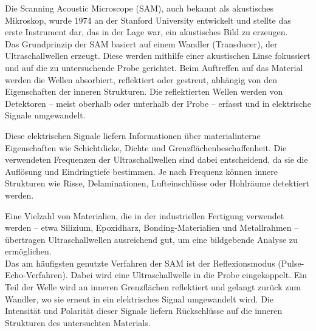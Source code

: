 Die Scanning Acoustic Microscope (SAM), auch bekannt als akustisches Mikroskop, wurde 1974 an der Stanford University entwickelt und stellte das erste Instrument dar, das in der Lage war, ein akustisches Bild zu erzeugen.\\

Das Grundprinzip der SAM basiert auf einem Wandler (Transducer), der Ultraschallwellen erzeugt. Diese werden mithilfe einer akustischen Linse fokussiert und auf die zu untersuchende Probe gerichtet. Beim Auftreffen auf das Material werden die Wellen absorbiert, reflektiert oder gestreut, abhängig von den Eigenschaften der inneren Strukturen. Die reflektierten Wellen werden von Detektoren – meist oberhalb oder unterhalb der Probe – erfasst und in elektrische Signale umgewandelt.

Diese elektrischen Signale liefern Informationen über materialinterne Eigenschaften wie Schichtdicke, Dichte und Grenzflächenbeschaffenheit. Die verwendeten Frequenzen der Ultraschallwellen sind dabei entscheidend, da sie die Auflösung und Eindringtiefe bestimmen. Je nach Frequenz können innere Strukturen wie Risse, Delaminationen, Lufteinschlüsse oder Hohlräume detektiert werden.

Eine Vielzahl von Materialien, die in der industriellen Fertigung verwendet werden – etwa Silizium, Epoxidharz, Bonding-Materialien und Metallrahmen – übertragen Ultraschallwellen ausreichend gut, um eine bildgebende Analyse zu ermöglichen.\\

Das am häufigsten genutzte Verfahren der SAM ist der Reflexionsmodus (Pulse-Echo-Verfahren). Dabei wird eine Ultraschallwelle in die Probe eingekoppelt. Ein Teil der Welle wird an inneren Grenzflächen reflektiert und gelangt zurück zum Wandler, wo sie erneut in ein elektrisches Signal umgewandelt wird. Die Intensität und Polarität dieser Signale liefern Rückschlüsse auf die inneren Strukturen des untersuchten Materials.
\\



